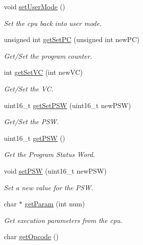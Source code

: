\begin{DoxyCompactItemize}
\item 
void \hyperlink{classcCPU_a176eb207069b99c47ddec6b466d1a92b}{set\-User\-Mode} ()
\begin{DoxyCompactList}\small\item\em \-Set the cpu back into user mode. \end{DoxyCompactList}\item 
unsigned int \hyperlink{classcCPU_ab04938ac939d530e521181db6a52944f}{get\-Set\-P\-C} (unsigned int new\-P\-C)
\begin{DoxyCompactList}\small\item\em \-Get/\-Set the program counter. \end{DoxyCompactList}\item 
int \hyperlink{classcCPU_a2d593a0d3d66e532826db4754d5fc4d2}{get\-Set\-V\-C} (int new\-V\-C)
\begin{DoxyCompactList}\small\item\em \-Get/\-Set the \-V\-C. \end{DoxyCompactList}\item 
uint16\-\_\-t \hyperlink{classcCPU_a0b13774a76c6b04d760b8ff072c37a85}{get\-Set\-P\-S\-W} (uint16\-\_\-t new\-P\-S\-W)
\begin{DoxyCompactList}\small\item\em \-Get/\-Set the \-P\-S\-W. \end{DoxyCompactList}\item 
uint16\-\_\-t \hyperlink{classcCPU_ad485374a709476e2dfb847046d3d5215}{get\-P\-S\-W} ()
\begin{DoxyCompactList}\small\item\em \-Get the \-Program \-Status \-Word. \end{DoxyCompactList}\item 
void \hyperlink{classcCPU_adb6ad793398d28b5615dd1377a619084}{set\-P\-S\-W} (uint16\-\_\-t new\-P\-S\-W)
\begin{DoxyCompactList}\small\item\em \-Set a new value for the \-P\-S\-W. \end{DoxyCompactList}\item 
char $\ast$ \hyperlink{classcCPU_a891d9b77e1818ca247e9d76f4db99415}{get\-Param} (int num)
\begin{DoxyCompactList}\small\item\em \-Get execution parameters from the cpu. \end{DoxyCompactList}\item 
char \hyperlink{classcCPU_a987e1ab511c71dcde48411f5bb16f9d8}{get\-Opcode} ()

\end{DoxyCompactItemize}
